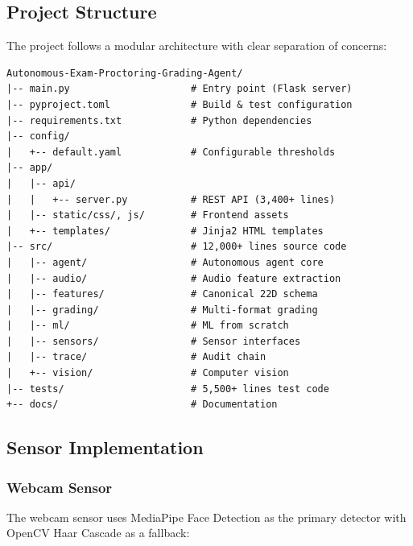 \documentclass{article}
\begin{document}
\subsection{Project Structure}

The project follows a modular architecture with clear separation of concerns:

\begin{lstlisting}[language={}, caption={Project directory structure}, label={lst:project_structure}]
Autonomous-Exam-Proctoring-Grading-Agent/
|-- main.py                     # Entry point (Flask server)
|-- pyproject.toml              # Build & test configuration
|-- requirements.txt            # Python dependencies
|-- config/
|   +-- default.yaml            # Configurable thresholds
|-- app/
|   |-- api/
|   |   +-- server.py           # REST API (3,400+ lines)
|   |-- static/css/, js/        # Frontend assets
|   +-- templates/              # Jinja2 HTML templates
|-- src/                        # 12,000+ lines source code
|   |-- agent/                  # Autonomous agent core
|   |-- audio/                  # Audio feature extraction
|   |-- features/               # Canonical 22D schema
|   |-- grading/                # Multi-format grading
|   |-- ml/                     # ML from scratch
|   |-- sensors/                # Sensor interfaces
|   |-- trace/                  # Audit chain
|   +-- vision/                 # Computer vision
|-- tests/                      # 5,500+ lines test code
+-- docs/                       # Documentation
\end{lstlisting}

\subsection{Sensor Implementation}

\subsubsection{Webcam Sensor}

The webcam sensor uses MediaPipe Face Detection \cite{mediapipe_face} as the primary detector with OpenCV Haar Cascade as a fallback:
\end{document}
